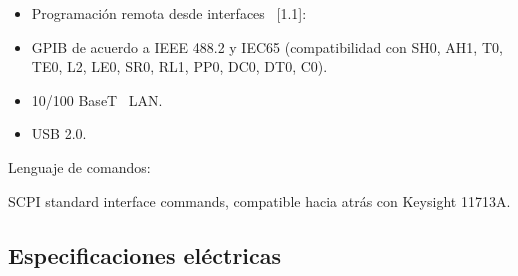 \documentclass[paper=letter,oneside,fontsize=10pt,parskip=full]{article}
\begin{document}
\begin{itemize}
\item Programación remota desde interfaces \ [1.1]:
\item GPIB de acuerdo a IEEE 488.2 y IEC65 (compatibilidad con SH0, AH1, T0, TE0, L2, LE0, SR0, RL1, PP0, DC0, DT0, C0).
\item 10/100 BaseT \ LAN.
\item USB 2.0.
\end{itemize}
Lenguaje de comandos:

SCPI standard interface commands, compatible hacia atrás con Keysight 11713A.

\subsection{Especificaciones eléctricas}
\end{document}
